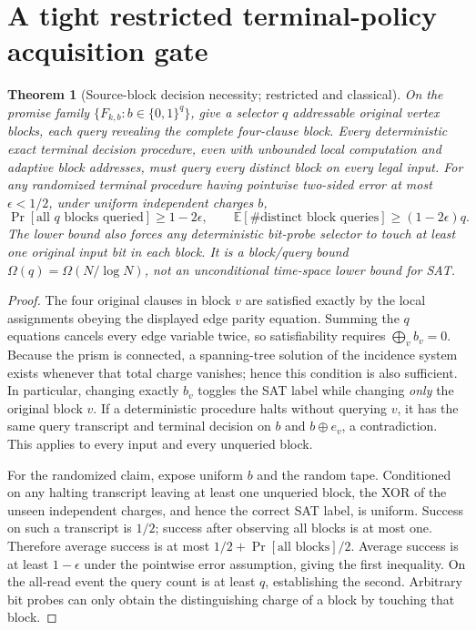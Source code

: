 \documentclass[11pt]{article}
\newtheorem{theorem}{Theorem}
\begin{document}
\section{A tight restricted terminal-policy acquisition gate}
\begin{theorem}[Source-block decision necessity; restricted and classical]
On the promise family $\{F_{k,b}:b\in\{0,1\}^{q}\}$, give a selector $q$ addressable original vertex blocks, each query revealing the complete four-clause block. Every deterministic exact terminal decision procedure, even with unbounded local computation and adaptive block addresses, must query every distinct block on \emph{every} legal input. For any randomized terminal procedure having pointwise two-sided error at most $\epsilon<1/2$, under uniform independent charges $b$,
\[
 \Pr[\text{all }q\text{ blocks queried}]\ge1-2\epsilon,
 \qquad \mathbb E[\#\text{distinct block queries}]\ge(1-2\epsilon)q.
\]
The lower bound also forces any deterministic bit-probe selector to touch at least one original input bit in each block. It is a \emph{block/query} bound $\Omega(q)=\Omega(N/\log N)$, not an unconditional time-space lower bound for SAT.
\end{theorem}
\begin{proof}
The four original clauses in block $v$ are satisfied exactly by the local assignments obeying the displayed edge parity equation. Summing the $q$ equations cancels every edge variable twice, so satisfiability requires $\bigoplus_v b_v=0$. Because the prism is connected, a spanning-tree solution of the incidence system exists whenever that total charge vanishes; hence this condition is also sufficient. In particular, changing exactly $b_v$ toggles the SAT label while changing \emph{only} the original block $v$. If a deterministic procedure halts without querying $v$, it has the same query transcript and terminal decision on $b$ and $b\oplus e_v$, a contradiction. This applies to every input and every unqueried block.

For the randomized claim, expose uniform $b$ and the random tape. Conditioned on any halting transcript leaving at least one unqueried block, the XOR of the unseen independent charges, and hence the correct SAT label, is uniform. Success on such a transcript is $1/2$; success after observing all blocks is at most one. Therefore average success is at most $1/2+\Pr[\text{all blocks}]/2$. Average success is at least $1-\epsilon$ under the pointwise error assumption, giving the first inequality. On the all-read event the query count is at least $q$, establishing the second. Arbitrary bit probes can only obtain the distinguishing charge of a block by touching that block.\qedhere
\end{proof}
\end{document}
